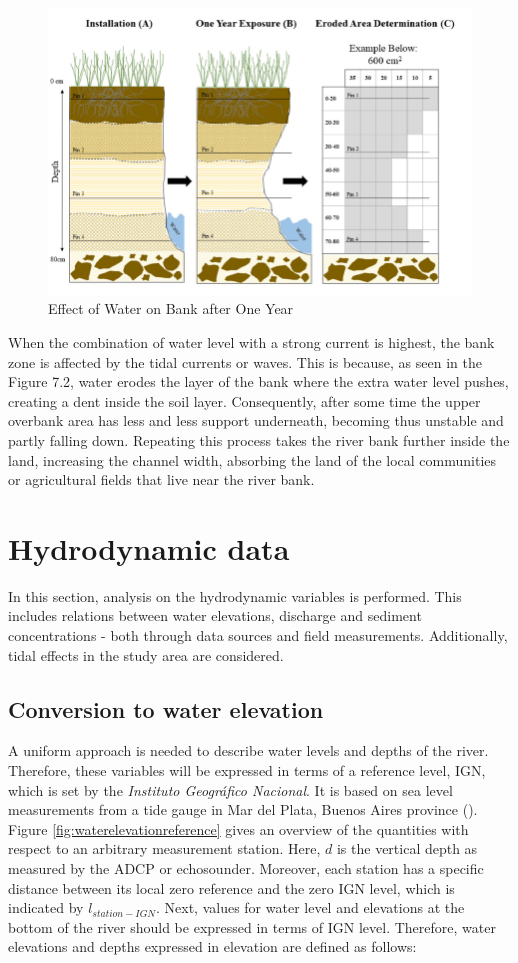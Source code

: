 \begin{figure}[H]
    \centering
    \includegraphics[width=0.5\linewidth]{figures/ch2/Erosion.png}
    \caption{Effect of Water on Bank after One Year}
    \label{fig:placeholder}
\end{figure}

When the combination of water level with a strong current is highest, the bank zone is affected by the tidal currents or waves. This is because, as seen in the Figure 7.2, water erodes the layer of the bank where the extra water level pushes, creating a dent inside the soil layer.
Consequently, after some time the upper overbank area has less and less support underneath, becoming thus unstable and partly falling down. 
Repeating this process takes the river bank further inside the land, increasing the channel width, absorbing the land of the local communities or agricultural fields that live near the river bank.


\section{Hydrodynamic data}
\label{sec 5.2 Hydrodynamic data}
In this section, analysis on the hydrodynamic variables is performed. This includes relations between water elevations, discharge and sediment concentrations - both through data sources and field measurements. Additionally, tidal effects in the study area are considered. 

\subsection{Conversion to water elevation}
A uniform approach is needed to describe water levels and depths of the river. Therefore, these variables will be expressed in terms of a reference level, IGN, which is set by the \textit{Instituto Geográfico Nacional}. It is based on sea level measurements from a tide gauge in Mar del Plata, Buenos Aires province (\cite{ReferenciaVerticalInstituto}). Figure \ref{fig:waterelevationreference} gives an overview of the quantities with respect to an arbitrary measurement station. Here, $d$ is the vertical depth as measured by the ADCP or echosounder. Moreover, each station has a specific distance between its local zero reference and the zero IGN level, which is indicated by $l_{station-IGN}$. Next, values for water level and elevations at the bottom of the river should be expressed in terms of IGN level. Therefore, water elevations and depths expressed in elevation are defined as follows:

